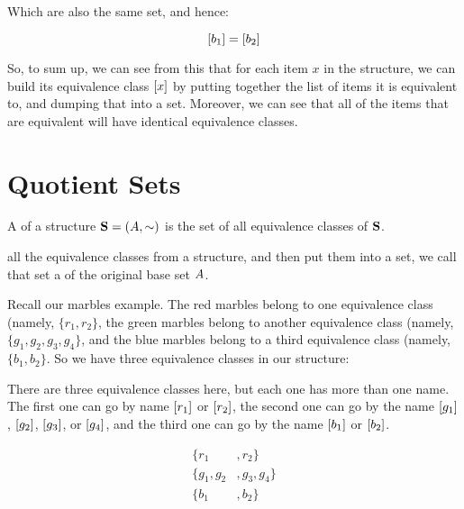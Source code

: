 \documentclass[../../../main.tex]{subfiles}
\begin{document}
Which are also the same set, and hence:

\begin{equation*}
  [b_{1}] = [b_{2}]
\end{equation*}

So, to sum up, we can see from this that for each item $x$ in the structure, we can build its equivalence class $[x]$ by putting together the list of items it is equivalent to, and dumping that into a set. Moreover, we can see that all of the items that are equivalent will have identical equivalence classes.


\section{Quotient Sets}

\begin{terminology}
  A  of a structure $\struct{S} = (\set{A}, \equivalence/)$ is the set of all equivalence classes of $\mathbf{S}$.
\end{terminology}

 all the equivalence classes from a structure, and then put them into a set, we call that set a  of the original base set $A$.

Recall our marbles example. The red marbles belong to one equivalence class (namely, $\{ r_{1}, r_{2} \}$, the green marbles belong to another equivalence class (namely, $\{ g_{1}, g_{2}, g_{3}, g_{4} \}$, and the blue marbles belong to a third equivalence class (namely, $\{ b_{1}, b_{2} \}$. So we have three equivalence classes in our structure:

\begin{aside}
  \begin{remark}
    There are three equivalence classes here, but each one has more than one name. The first one can go by name $[r_{1}]$ or $[r_{2}]$, the second one can go by the name $[g_{1}]$, $[g_{2}]$, $[g_{3}]$, or $[g_{4}]$, and the third one can go by the name $[b_{1}]$ or $[b_{2}]$.
  \end{remark}
\end{aside}

\begin{align*}
  \{ r_{1}&, r_{2} \} \\
  \{ g_{1}, g_{2}&, g_{3}, g_{4} \} \\
  \{ b_{1}&, b_{2} \}
\end{align*}
\end{document}
